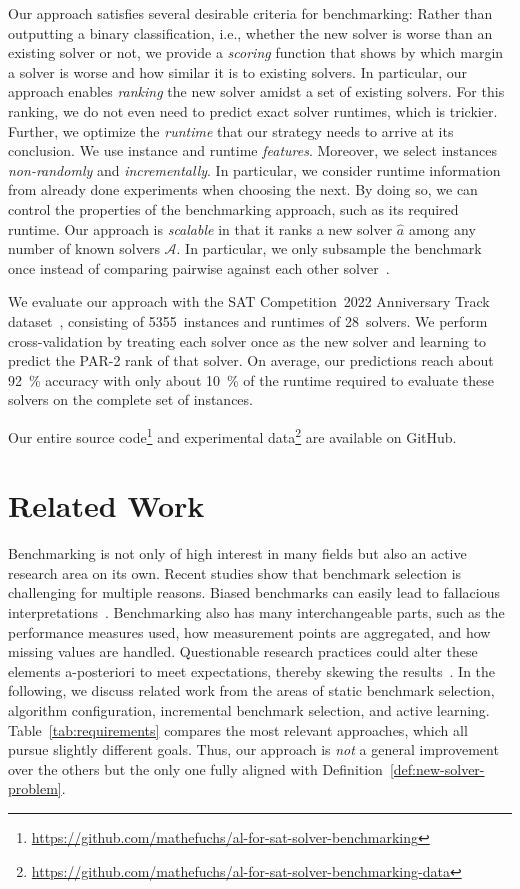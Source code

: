 \documentclass[runningheads]{llncs}
\begin{document}
Our approach satisfies several desirable criteria for benchmarking:
Rather than outputting a binary classification, i.e., whether the new solver is worse than an existing solver or not, we provide a \emph{scoring} function that shows by which margin a solver is worse and how similar it is to existing solvers.
In particular, our approach enables \emph{ranking} the new solver amidst a set of existing solvers.
For this ranking, we do not even need to predict exact solver runtimes, which is trickier.
Further, we optimize the \emph{runtime} that our strategy needs to arrive at its conclusion.
We use instance and runtime \emph{features}.
Moreover, we select instances \emph{non-randomly} and \emph{incrementally}.
In particular, we consider runtime information from already done experiments when choosing the next.
By doing so, we can control the properties of the benchmarking approach, such as its required runtime.
Our approach is \emph{scalable} in that it ranks a new solver $\hat{a}$ among any number of known solvers $\mathcal{A}$.
In particular, we only subsample the benchmark once instead of comparing pairwise against each other solver~\cite{MatriconAFSH21}.

We evaluate our approach with the SAT Competition~2022 Anniversary Track dataset~\cite{sat2022}, consisting of 5355~instances and runtimes of 28~solvers.
We perform cross-validation by treating each solver once as the new solver and learning to predict the PAR-2 rank of that solver.
On average, our predictions reach about \SI{92}{\%} accuracy with only about \SI{10}{\%} of the runtime required to evaluate these solvers on the complete set of instances.

Our entire source code\footnote{\url{https://github.com/mathefuchs/al-for-sat-solver-benchmarking}} and experimental data\footnote{\url{https://github.com/mathefuchs/al-for-sat-solver-benchmarking-data}} are available on GitHub.

\section{Related Work}

Benchmarking is not only of high interest in many fields but also an active research area on its own.
Recent studies show that benchmark selection is challenging for multiple reasons.
Biased benchmarks can easily lead to fallacious interpretations~\cite{abs-2107-07002}.
Benchmarking also has many interchangeable parts, such as the performance measures used, how measurement points are aggregated, and how missing values are handled.
Questionable research practices could alter these elements a-posteriori to meet expectations, thereby skewing the results~\cite{NiesslHWCB22}.
In the following, we discuss related work from the areas of static benchmark selection, algorithm configuration, incremental benchmark selection, and active learning.
Table~\ref{tab:requirements} compares the most relevant approaches, which all pursue slightly different goals.
Thus, our approach is \emph{not} a general improvement over the others but the only one fully aligned with Definition~\ref{def:new-solver-problem}.
\end{document}
